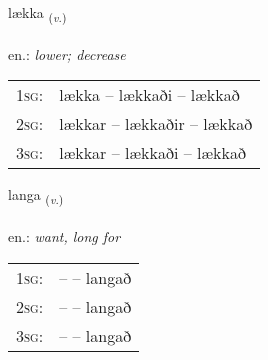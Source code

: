 \documentclass[frontgrid, backgrid]{flacards}\usepackage[]{graphicx}\usepackage[]{xcolor}
\begin{document}
\renewcommand{\blhead}{\vskip5pt {\small\bfseries\footnotesize Sagnorð | Verb }}
\renewcommand{\bcfoot}{\vskip5pt \hspace{2pt}{\small\bfseries\footnotesize 1K}}


{lækka \small{\textsubscript{(\textit{v.})}} \\[1ex] %
\textphonetic{[laihka]} \\
en.: \emph{lower; decrease} \\  [2ex]
\renewcommand*{\arraystretch}{0.8}
\begin{tabular}{p{1cm}l}
\textsc{1sg}: & lækka -- lækkaði -- lækkað \\ 
\textsc{2sg}: & lækkar -- lækkaðir -- lækkað \\ 
\textsc{3sg}: & lækkar -- lækkaði -- lækkað \\ 
\end{tabular}
}

\renewcommand{\flhead}{\vskip5pt \fboxsep=0pt {\small\bfseries\footnotesize Sagnorð | Verb}}
\renewcommand{\fcfoot}{\vskip5pt \fboxsep=0pt \hspace{2pt}{\small\bfseries\footnotesize 1K}}

\renewcommand{\blhead}{\vskip5pt {\small\bfseries\footnotesize Sagnorð | Verb }}
\renewcommand{\bcfoot}{\vskip5pt \hspace{2pt}{\small\bfseries\footnotesize 1K}}


{langa \small{\textsubscript{(\textit{v.})}} \\[1ex] %
\textphonetic{[lauŋka]} \\
en.: \emph{want, long for} \\  [2ex]
\renewcommand*{\arraystretch}{0.8}
\begin{tabular}{p{1cm}l}
\textsc{1sg}: &  --  -- langað \\ 
\textsc{2sg}: &  --  -- langað \\ 
\textsc{3sg}: &  --  -- langað \\ 
\end{tabular}
}
\end{document}
